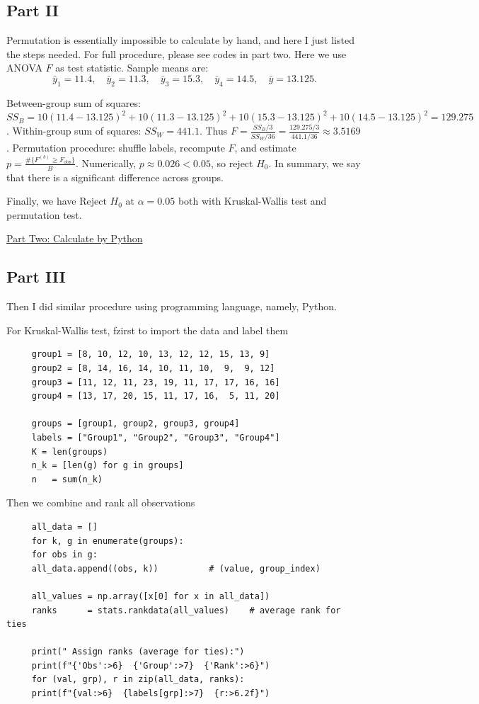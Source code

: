 \documentclass[letterpaper]{article}
\begin{document}
		\clearpage
		\subsection{Part II}
			
			Permutation is essentially impossible to calculate by hand, and here I just listed the steps needed. For full procedure, please see codes in part two. Here we use ANOVA $F$ as test statistic.
			Sample means are:
			\[
			\bar y_1=11.4,\quad \bar y_2=11.3,\quad \bar y_3=15.3,\quad \bar y_4=14.5,\quad \bar y=13.125.
			\]
			
			Between-group sum of squares:
			$SS_B=10(11.4-13.125)^2+10(11.3-13.125)^2+10(15.3-13.125)^2+10(14.5-13.125)^2=129.275$.
			Within-group sum of squares:
			$SS_W=441.1$.
			Thus
			$F=\frac{SS_B/3}{SS_W/36}=\frac{129.275/3}{441.1/36}\approx 3.5169$.
			Permutation procedure: shuffle labels, recompute $F$, and estimate
			$p=\frac{\#\{F^{(b)}\ge F_{\text{obs}}\}}{B}$.
			Numerically, $p\approx 0.026<0.05$, so reject $H_0$. In summary, we say that there is a significant difference across groups.
			
		
		Finally, we have ${\text{Reject }H_0\text{ at }\alpha=0.05}$ both with Kruskal-Wallis test and permutation test.
		
	\clearpage
		
		\underline{Part Two: Calculate by Python}
		
		\subsection{Part III}
		Then I did similar procedure using programming language, namely, Python.
		
		For  Kruskal-Wallis test, fzirst to import the data and label them
\begin{lstlisting}
     group1 = [8, 10, 12, 10, 13, 12, 12, 15, 13, 9]
     group2 = [8, 14, 16, 14, 10, 11, 10,  9,  9, 12]
     group3 = [11, 12, 11, 23, 19, 11, 17, 17, 16, 16]
     group4 = [13, 17, 20, 15, 11, 17, 16,  5, 11, 20]
     
     groups = [group1, group2, group3, group4]
     labels = ["Group1", "Group2", "Group3", "Group4"]
     K = len(groups)
     n_k = [len(g) for g in groups]
     n   = sum(n_k)
\end{lstlisting}

Then we combine and rank all observations

\begin{lstlisting}
     all_data = []
     for k, g in enumerate(groups):
     for obs in g:
     all_data.append((obs, k))          # (value, group_index)
     
     all_values = np.array([x[0] for x in all_data])
     ranks      = stats.rankdata(all_values)    # average rank for ties
     
     print(" Assign ranks (average for ties):")
     print(f"{'Obs':>6}  {'Group':>7}  {'Rank':>6}")
     for (val, grp), r in zip(all_data, ranks):
     print(f"{val:>6}  {labels[grp]:>7}  {r:>6.2f}")
\end{lstlisting}
\end{document}
